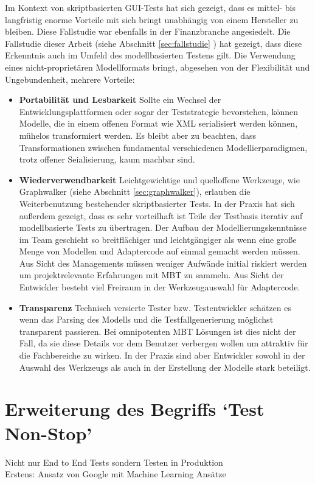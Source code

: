 Im Kontext von skriptbasierten GUI-Tests hat sich gezeigt, dass es mittel- bis langfristig enorme Vorteile mit sich bringt unabhängig von einem Hersteller zu bleiben. Diese Fallstudie war ebenfalls in der Finanzbranche angesiedelt\cite{graham_experiences_2012}. Die Fallstudie dieser Arbeit (siehe Abschnitt \ref{sec:fallstudie} ) hat gezeigt, dass diese Erkenntnis auch im Umfeld des modellbasierten Testens gilt. Die Verwendung eines nicht-proprietären Modellformats bringt, abgesehen von der Flexibilität und Ungebundenheit, mehrere Vorteile:

\begin{itemize}
\item \textbf{Portabilität und Lesbarkeit} Sollte ein Wechsel der Entwicklungsplattformen oder sogar der Teststrategie bevorstehen, können Modelle, die in einem offenen Format wie XML serialisiert werden können, mühelos transformiert werden. Es bleibt aber zu beachten, dass Transformationen zwischen fundamental verschiedenen Modellierparadigmen, trotz offener Seialisierung, kaum machbar sind.
\item \textbf{Wiederverwendbarkeit} Leichtgewichtige und quelloffene Werkzeuge, wie Graphwalker (siehe Abschnitt \ref{sec:graphwalker}), erlauben die Weiterbenutzung bestehender skriptbasierter Tests. In der Praxis hat sich außerdem gezeigt, dass es sehr vorteilhaft ist Teile der Testbasis iterativ auf modellbasierte Tests zu übertragen. Der Aufbau der Modellierungskenntnisse im Team geschieht so breitflächiger und leichtgängiger als wenn eine große Menge von Modellen und Adaptercode auf einmal gemacht werden müssen. Aus Sicht des Managements müssen weniger Aufwände initial riskiert werden um projektrelevante Erfahrungen mit \Gls{MBT} zu sammeln. Aus Sicht der Entwickler besteht viel Freiraum in der Werkzeugauswahl für Adaptercode.
\item \textbf{Transparenz} Technisch versierte Tester bzw. Testentwickler schätzen es wenn das Parsing des Modells und die Testfallgenerierung möglichst transparent passieren. Bei omnipotenten \Gls{MBT} Lösungen ist dies nicht der Fall, da sie diese Details vor dem Benutzer verbergen wollen um attraktiv für die Fachbereiche zu wirken. In der Praxis sind aber Entwickler sowohl in der Auswahl des Werkzeugs als auch in der Erstellung der Modelle stark beteiligt.
\end{itemize}


\section{Erweiterung des Begriffs `Test Non-Stop'}
Nicht nur End to End Tests sondern Testen in Produktion\\
Erstens: Ansatz von Google mit Machine Learning Ansätze

